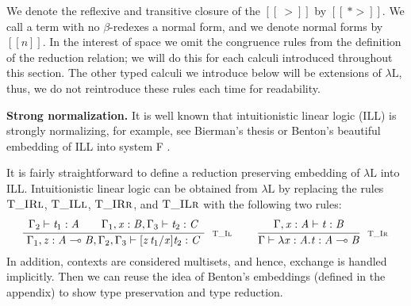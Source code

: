 \documentclass{llncs}
\begin{document}
We denote the reflexive and transitive closure of the $[[~>]]$ by
$[[~*>]]$.  We call a term with no $\beta$-redexes a normal form,
and we denote normal forms by $[[n]]$.  In the interest of space we
omit the congruence rules from the definition of the reduction
relation; we will do this for each calculi introduced throughout this
section.  The other typed calculi we introduce below will be
extensions of $\lambda\text{L}$, thus, we do not reintroduce these
rules each time for readability.

\textbf{Strong normalization.}  It is well known that intuitionistic
linear logic (ILL) is strongly normalizing, for example, see Bierman's
thesis \cite{Bierman:1994} or Benton's beautiful embedding of ILL into
system F \cite{Benton:1995c}.  

It is fairly straightforward to define a reduction preserving
embedding of $\lambda\text{L}$ into ILL.  Intuitionistic linear logic
can be obtained from $\lambda\text{L}$ by replacing the rules
$\textsc{T\_IRl}$, $\textsc{T\_ILl}$, $\textsc{T\_IRr}$,
and $\textsc{T\_ILr}$ with the following two rules:
\[
\begin{array}{cccccccc}
  \LdruleTXXIl{} & \quad \LdruleTXXIr{}
\end{array}
\]
In addition, contexts are considered multisets, and hence, exchange is
handled implicitly. Then we can reuse the idea of Benton's embeddings
(defined in the appendix) to show type preservation and type
reduction.
\end{document}
